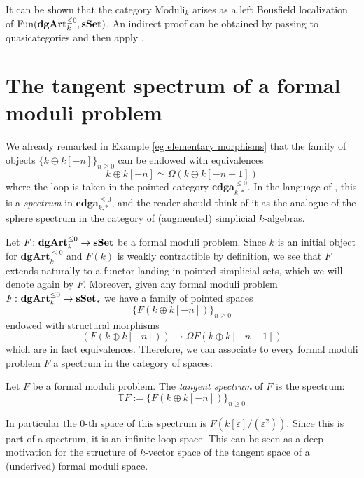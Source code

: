 \begin{refsection}
\begin{rmk}
It can be shown that the category $\mathrm{Moduli}_k$ arises as a left Bousfield localization of $\mathrm{Fun}(\mathbf{dgArt}_k^{\le 0}, \mathbf{sSet})$. An indirect proof can be obtained by passing to quasicategories and then apply \cite[Propositions 5.5.4.18 and 5.5.4.19]{htt}.
\end{rmk}

\section{The tangent spectrum of a formal moduli problem}

We already remarked in Example \ref{eg elementary morphisms} that the family of objects $\{k \oplus k[-n]\}_{n \ge 0}$ can be endowed with equivalences
\[
k \oplus k[-n] \simeq \Omega( k \oplus k[-n-1] )
\]
where the loop is taken in the pointed category $\mathbf{cdga}_{k,*}^{\le 0}$. In the language of \cite{ha}, this is a \emph{spectrum} in $\mathbf{cdga}_{k,*}^{\le 0}$, and the reader should think of it as the analogue of the sphere spectrum in the category of (augmented) simplicial $k$-algebras.

Let $F \colon \mathbf{dgArt}_k^{\le 0} \to \mathbf{sSet}$ be a formal moduli problem. Since $k$ is an initial object for $\mathbf{dgArt}_k^{\le 0}$ and $F(k)$ is weakly contractible by definition, we see that $F$ extends naturally to a functor landing in pointed simplicial sets, which we will denote again by $F$. Moreover, given any formal moduli problem $F \colon \mathbf{dgArt}_k^{\le 0} \to \mathbf{sSet}_*$ we have a family of pointed spaces
\[
\{F(k \oplus k[-n])\}_{n \ge 0}
\]
endowed with structural morphisms
\[
(F(k \oplus k[-n])) \to \Omega F(k \oplus k[-n-1])
\]
which are in fact equivalences. Therefore, we can associate to every formal moduli problem $F$ a spectrum in the category of spaces:

\begin{defin}
Let $F$ be a formal moduli problem. The \emph{tangent spectrum} of $F$ is the spectrum:
\[
\mathbb T F := \{F(k \oplus k[-n])\}_{n \ge 0}
\]
\end{defin}

\begin{rmk}
In particular the $0$-th space of this spectrum is $F(k[\varepsilon]/(\varepsilon^2))$. Since this is part of a spectrum, it is an infinite loop space. This can be seen as a deep motivation for the structure of $k$-vector space of the tangent space of a (underived) formal moduli space.
\end{rmk}


\end{refsection}
